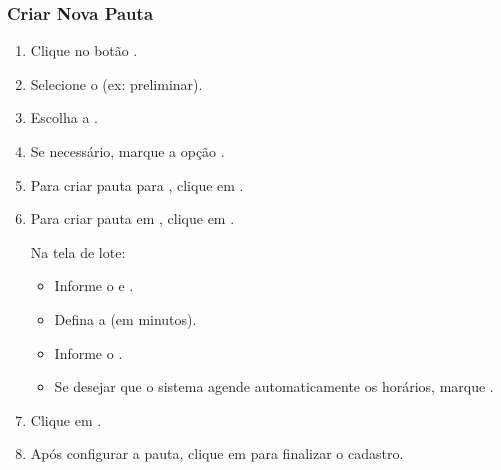 \documentclass[letterpaper,10pt,brazil]{sphinxmanual}
\begin{document}
\subsubsection{Criar Nova Pauta}
\label{\detokenize{projud_46_comopautaraudiencia:criar-nova-pauta}}\begin{enumerate}
%
\item {} 
\sphinxAtStartPar
Clique no botão .

\item {} 
\sphinxAtStartPar
Selecione o  (ex: preliminar).

\item {} 
\sphinxAtStartPar
Escolha a .

\item {} 
\sphinxAtStartPar
Se necessário, marque a opção .

\item {} 
\sphinxAtStartPar
Para criar pauta para , clique em .

\item {} 
\sphinxAtStartPar
Para criar pauta em , clique em .

\sphinxAtStartPar
Na tela de lote:
\begin{itemize}
\item {} 
\sphinxAtStartPar
Informe o  e .

\item {} 
\sphinxAtStartPar
Defina a  (em minutos).

\item {} 
\sphinxAtStartPar
Informe o .

\item {} 
\sphinxAtStartPar
Se desejar que o sistema agende automaticamente os horários, marque .

\end{itemize}

\item {} 
\sphinxAtStartPar
Clique em .

\item {} 
\sphinxAtStartPar
Após configurar a pauta, clique em  para finalizar o cadastro.

\end{enumerate}
\end{document}
